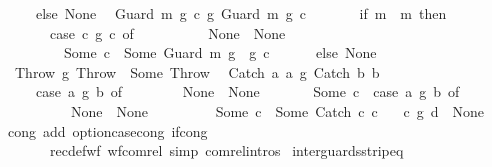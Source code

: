\begin{isabellebody}
\ \ \ \ \ else\ None{\isacharparenright}{\isachardoublequoteclose}\isanewline
\ \ {\isachardoublequoteopen}{\isacharparenleft}Guard\ m{}\ g{}\ c{}\ {\isasyminter}\isactrlsub g\ Guard\ m{}\ g{}\ c{}{\isacharparenright}\ {\isacharequal}\ \isanewline
\ \ \ \ \ {\isacharparenleft}if\ m{}\ {\isacharequal}\ m{}\ then\isanewline
\ \ \ \ \ \ \ {\isacharparenleft}case\ c{}\ {\isasyminter}\isactrlsub g\ c{}\ of\isanewline
\ \ \ \ \ \ \ \ \ \ None\ {\isasymRightarrow}\ None\isanewline
\ \ \ \ \ \ \ \ {\isacharbar}\ Some\ c\ {\isasymRightarrow}\ Some\ {\isacharparenleft}Guard\ m{}\ {\isacharparenleft}g{}\ {\isasyminter}\ g{}{\isacharparenright}\ c{\isacharparenright}{\isacharparenright}\isanewline
\ \ \ \ \ \ else\ None{\isacharparenright}{\isachardoublequoteclose}\isanewline
\ \ {\isachardoublequoteopen}{\isacharparenleft}Throw\ {\isasyminter}\isactrlsub g\ Throw{\isacharparenright}\ {\isacharequal}\ Some\ Throw{\isachardoublequoteclose}\isanewline
\ \ {\isachardoublequoteopen}{\isacharparenleft}Catch\ a{}\ a{}\ {\isasyminter}\isactrlsub g\ Catch\ b{}\ b{}{\isacharparenright}\ {\isacharequal}\ \isanewline
\ \ \ \ \ {\isacharparenleft}case\ a{}\ {\isasyminter}\isactrlsub g\ b{}\ of\isanewline
\ \ \ \ \ \ \ \ None\ {\isasymRightarrow}\ None\isanewline
\ \ \ \ \ \ {\isacharbar}\ Some\ c{}\ {\isasymRightarrow}\ {\isacharparenleft}case\ a{}\ {\isasyminter}\isactrlsub g\ b{}\ of\isanewline
\ \ \ \ \ \ \ \ \ \ None\ {\isasymRightarrow}\ None\isanewline
\ \ \ \ \ \ \ \ {\isacharbar}\ Some\ c{}\ {\isasymRightarrow}\ Some\ {\isacharparenleft}Catch\ c{}\ c{}{\isacharparenright}{\isacharparenright}{\isacharparenright}{\isachardoublequoteclose}\ \isanewline
\ \ {\isachardoublequoteopen}{\isacharparenleft}c\ {\isasyminter}\isactrlsub g\ d{\isacharparenright}\ {\isacharequal}\ None{\isachardoublequoteclose}\isanewline
{\isacharparenleft}\ cong\ add{\isacharcolon}\ option{\isachardot}case{\isacharunderscore}cong\ if{\isacharunderscore}cong\ \ \isanewline
\ \ \ \ \ \ \ recdef{\isacharunderscore}wf{\isacharcolon}\ wf{\isacharunderscore}com{\isacharunderscore}rel\ simp{\isacharcolon}\ com{\isacharunderscore}rel{\isachardot}intros{\isacharparenright}\isanewline
\isanewline
{}\isamarkupfalse%
\ inter{\isacharunderscore}guards{\isacharunderscore}strip{\isacharunderscore}eq{\isacharcolon}\isanewline

\end{isabellebody}
